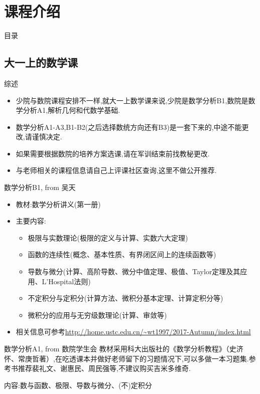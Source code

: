 \documentclass[pdf]{beamer}
\numberwithin{equation}{section}
\theoremstyle{plain}
\theoremstyle{plain}
\theoremstyle{plain}
\theoremstyle{remark}
\begin{document}
\section{课程介绍}
\begin{frame}{目录}
\tableofcontents[currentsection]
\end{frame}
\subsection{大一上的数学课}
\begin{frame}{综述}
	\begin{itemize}
		\item 少院与数院课程安排不一样,就大一上数学课来说,少院是数学分析B1,数院是数学分析A1,解析几何和代数学基础.
		\item 数学分析A1-A3,B1-B2(之后选择数统方向还有B3)是一套下来的,中途不能更改,请谨慎决定.
		\item 如果需要根据数院的培养方案选课,请在军训结束前找教秘更改.
		\item 与老师相关的课程信息请自己上评课社区查询,这里不做公开推荐.
	\end{itemize}
\end{frame}
\begin{frame}{数学分析B1, from 吴天}
	\begin{itemize}
		\item 教材:数学分析讲义(第一册)

	\item 主要内容:\begin{itemize}
		\item 极限与实数理论(极限的定义与计算、实数六大定理)
		\item 函数的连续性(概念、基本性质、有界闭区间上的连续函数等)
		\item 导数与微分(计算、高阶导数、微分中值定理、极值、Taylor定理及其应用、L'Hospital法则)
		\item 不定积分与定积分(计算方法、微积分基本定理、计算定积分等)
		\item 微积分的应用与无穷级数理论(计算、审敛等)
	\end{itemize}
	\item 相关信息可参考\url{http://home.ustc.edu.cn/~wt1997/2017-Autumn/index.html}
	\end{itemize}
\end{frame}
\begin{frame}{数学分析A1, from 数院学生会}
	\hspace*{20pt}教材采用科大出版社的《数学分析教程》（史济怀、常庚哲著）,在吃透课本并做好老师留下的习题情况下,可以多做一本习题集.参考书推荐裴礼文、谢惠民、周民强等,不建议购买吉米多维奇.
	
	\hspace*{20pt}内容:数与函数、极限、导数与微分、(不)定积分
\end{frame}
\end{document}
